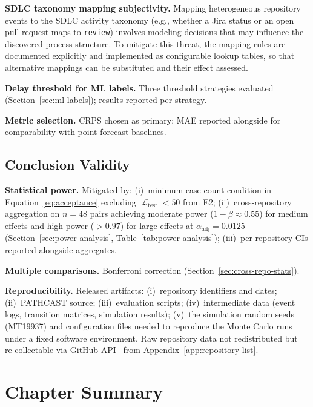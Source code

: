 \textbf{SDLC taxonomy mapping subjectivity.} Mapping heterogeneous
repository events to the SDLC activity taxonomy (e.g., whether a Jira status
or an open pull request maps to \texttt{review}) involves modeling decisions
that may influence the discovered process structure. To mitigate this
threat, the mapping rules are documented explicitly and implemented as
configurable lookup tables, so that alternative mappings can be substituted
and their effect assessed.

\textbf{Delay threshold for ML labels.} Three threshold strategies
evaluated (Section~\ref{sec:ml-labels}); results reported per strategy.

\textbf{Metric selection.} CRPS chosen as primary; MAE reported
alongside for comparability with point-forecast baselines.


\subsection{Conclusion Validity}
\label{sec:threats-conclusion}

\textbf{Statistical power.} Mitigated by:
(i)~minimum case count condition in Equation~\ref{eq:acceptance}
excluding $|\mathcal{L}_{\text{test}}| < 50$ from E2;
(ii)~cross-repository aggregation on $n = 48$ pairs achieving moderate
power ($1-\beta \approx 0.55$) for medium effects and high power
($> 0.97$) for large effects at $\alpha_{\text{adj}} = 0.0125$
(Section~\ref{sec:power-analysis}, Table~\ref{tab:power-analysis});
(iii)~per-repository CIs reported alongside aggregates.

\textbf{Multiple comparisons.} Bonferroni correction
(Section~\ref{sec:cross-repo-stats}).

\textbf{Reproducibility.} Released artifacts: (i)~repository identifiers
and dates; (ii)~PATHCAST source; (iii)~evaluation scripts;
(iv)~intermediate data (event logs, transition matrices, simulation
results); (v)~the simulation random seeds (MT19937) and configuration files
needed to reproduce the Monte Carlo runs under a fixed software environment.
Raw repository data not redistributed but
re-collectable via GitHub API~\cite{github2023api} from
Appendix~\ref{app:repository-list}.


\section{Chapter Summary}
\label{sec:methodology-summary}

